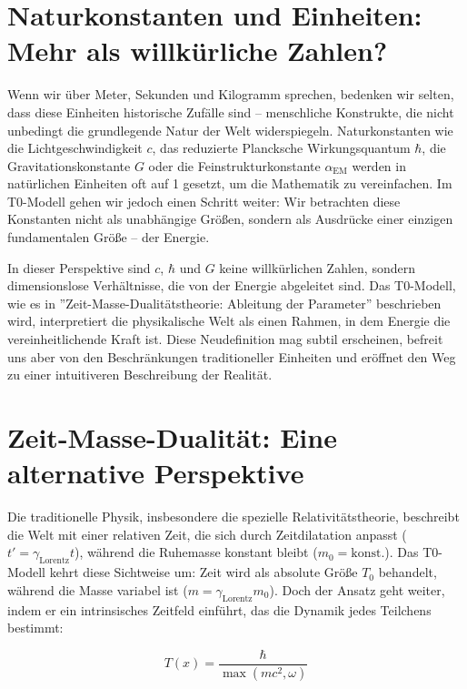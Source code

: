 \documentclass[a4paper,12pt]{article}
\newcommand{\Tfield}{T(x)}
\newcommand{\alphaEM}{\alpha_{\text{EM}}}
\newcommand{\gammaf}{\gamma_{\text{Lorentz}}}
\begin{document}
	\section{Naturkonstanten und Einheiten: Mehr als willkürliche Zahlen?}
	
	Wenn wir über Meter, Sekunden und Kilogramm sprechen, bedenken wir selten, dass diese Einheiten historische Zufälle sind – menschliche Konstrukte, die nicht unbedingt die grundlegende Natur der Welt widerspiegeln. Naturkonstanten wie die Lichtgeschwindigkeit \(c\), das reduzierte Plancksche Wirkungsquantum \(\hbar\), die Gravitationskonstante \(G\) oder die Feinstrukturkonstante \(\alphaEM\) werden in natürlichen Einheiten oft auf 1 gesetzt, um die Mathematik zu vereinfachen. Im T0-Modell gehen wir jedoch einen Schritt weiter: Wir betrachten diese Konstanten nicht als unabhängige Größen, sondern als Ausdrücke einer einzigen fundamentalen Größe – der Energie.
	
	In dieser Perspektive sind \(c\), \(\hbar\) und \(G\) keine willkürlichen Zahlen, sondern dimensionslose Verhältnisse, die von der Energie abgeleitet sind. Das T0-Modell, wie es in ''Zeit-Masse-Dualitätstheorie: Ableitung der Parameter'' \cite{pascher_params_2025} beschrieben wird, interpretiert die physikalische Welt als einen Rahmen, in dem Energie die vereinheitlichende Kraft ist. Diese Neudefinition mag subtil erscheinen, befreit uns aber von den Beschränkungen traditioneller Einheiten und eröffnet den Weg zu einer intuitiveren Beschreibung der Realität.
	
	\section{Zeit-Masse-Dualität: Eine alternative Perspektive}
	
	Die traditionelle Physik, insbesondere die spezielle Relativitätstheorie, beschreibt die Welt mit einer relativen Zeit, die sich durch Zeitdilatation anpasst (\(t' = \gammaf t\)), während die Ruhemasse konstant bleibt (\(m_0 = \text{konst.}\)). Das T0-Modell kehrt diese Sichtweise um: Zeit wird als absolute Größe \(T_0\) behandelt, während die Masse variabel ist (\(m = \gammaf m_0\)). Doch der Ansatz geht weiter, indem er ein intrinsisches Zeitfeld einführt, das die Dynamik jedes Teilchens bestimmt:
	
	\begin{equation}
		\Tfield = \frac{\hbar}{\max(m c^2, \omega)}
	\end{equation}
	
\end{document}
